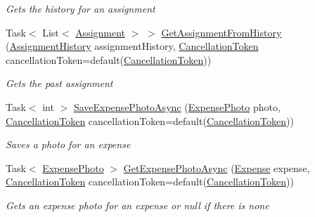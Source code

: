 \begin{DoxyCompactItemize}
\begin{DoxyCompactList}\small\item\em Gets the history for an assignment \end{DoxyCompactList}\item 
Task$<$ List$<$ \hyperlink{class_field_service_1_1_data_1_1_assignment}{Assignment} $>$ $>$ \hyperlink{class_field_service_1_1_data_1_1_sample_assignment_service_aef9d519c2e35704cb3d94e1831ab4c01}{Get\+Assignment\+From\+History} (\hyperlink{class_field_service_1_1_data_1_1_assignment_history}{Assignment\+History} assignment\+History, \hyperlink{_view_models_2_assignment_view_model_8cs_aba80ec766846c61f55644fd23860cb18}{Cancellation\+Token} cancellation\+Token=default(\hyperlink{_view_models_2_assignment_view_model_8cs_aba80ec766846c61f55644fd23860cb18}{Cancellation\+Token}))
\begin{DoxyCompactList}\small\item\em Gets the past assignment \end{DoxyCompactList}\item 
Task$<$ int $>$ \hyperlink{class_field_service_1_1_data_1_1_sample_assignment_service_a8c48b09e431e65ced2e0f6ee7624745f}{Save\+Expense\+Photo\+Async} (\hyperlink{class_field_service_1_1_data_1_1_expense_photo}{Expense\+Photo} photo, \hyperlink{_view_models_2_assignment_view_model_8cs_aba80ec766846c61f55644fd23860cb18}{Cancellation\+Token} cancellation\+Token=default(\hyperlink{_view_models_2_assignment_view_model_8cs_aba80ec766846c61f55644fd23860cb18}{Cancellation\+Token}))
\begin{DoxyCompactList}\small\item\em Saves a photo for an expense \end{DoxyCompactList}\item 
Task$<$ \hyperlink{class_field_service_1_1_data_1_1_expense_photo}{Expense\+Photo} $>$ \hyperlink{class_field_service_1_1_data_1_1_sample_assignment_service_a08b661fdcc91ea6c6ce09b85140ec485}{Get\+Expense\+Photo\+Async} (\hyperlink{class_field_service_1_1_data_1_1_expense}{Expense} expense, \hyperlink{_view_models_2_assignment_view_model_8cs_aba80ec766846c61f55644fd23860cb18}{Cancellation\+Token} cancellation\+Token=default(\hyperlink{_view_models_2_assignment_view_model_8cs_aba80ec766846c61f55644fd23860cb18}{Cancellation\+Token}))
\begin{DoxyCompactList}\small\item\em Gets an expense photo for an expense or null if there is none \end{DoxyCompactList}\end{DoxyCompactItemize}


